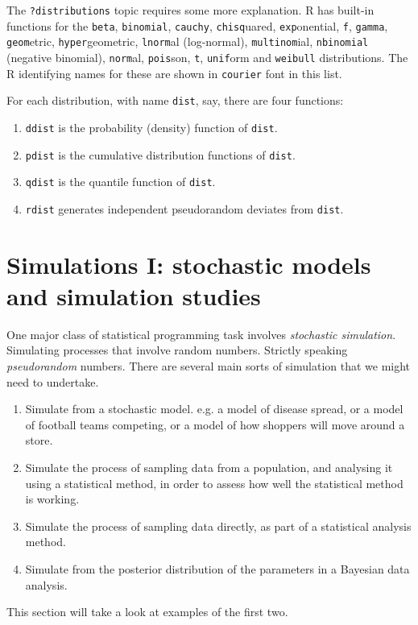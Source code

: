 \documentclass[10pt] {article}
\theoremstyle{definition}
\begin{document}
The {\lstinline+?distributions+} topic requires some more explanation. R has built-in functions for the {\lstinline+beta+}, {\lstinline+binomial+}, {\lstinline+cauchy+}, {\lstinline+chisq+}uared, {\lstinline+exp+}onential, {\lstinline+f+}, {\lstinline+gamma+}, {\lstinline+geom+}etric, {\lstinline+hyper+}geometric, {\lstinline+lnorm+}al (log-normal), {\lstinline+multinom+}ial, {\lstinline+nbinomial+} (negative binomial), {\lstinline+norm+}al, {\lstinline+pois+}son, {\lstinline+t+}, {\lstinline+unif+}orm and {\lstinline+weibull+} distributions. The R identifying names for these are shown in {\lstinline+courier+} font in this list. 

For each distribution, with name {\lstinline+dist+}, say, there are four functions:
\begin{enumerate}
\item {\lstinline+ddist+} is the probability (density) function of {\lstinline+dist+}.
\item {\lstinline+pdist+} is the cumulative distribution functions of {\lstinline+dist+}.
\item {\lstinline+qdist+} is the quantile function of {\lstinline+dist+}.
\item {\lstinline+rdist+} generates independent pseudorandom deviates from {\lstinline+dist+}. 
\end{enumerate}

\section{Simulations I: stochastic models and simulation studies}

One major class of statistical programming task involves {\em stochastic simulation}. Simulating processes that involve random numbers. Strictly speaking {\em pseudorandom} numbers. There are several main sorts of simulation that we might need to undertake.
\begin{enumerate}
\item Simulate from a stochastic model. e.g. a model of disease spread, or a model of football teams competing, or a model of how shoppers will move around a store.
\item Simulate the process of sampling data from a population, and analysing it using a statistical method, in order to assess how well the statistical method is working. 
\item Simulate the process of sampling data directly, as part of a statistical analysis method.
\item Simulate from the posterior distribution of the parameters in a Bayesian data analysis.
\end{enumerate}  
This section will take a look at examples of the first two. 
\end{document}
